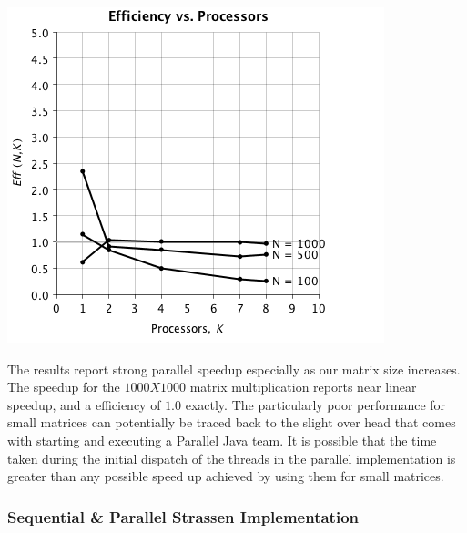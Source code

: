 \documentclass{dependencies/acm_proc_article-sp}
\begin{document}
\begin{center}
\includegraphics[scale=0.5]{images/parallel/eff-vs-proc.png}
\end{center}
The results report strong parallel speedup especially as our matrix 
size increases. The speedup for the $1000 X 1000$ matrix multiplication reports
near linear speedup, and a efficiency of $1.0$ exactly. The particularly poor performance
for small matrices can potentially be traced back to the slight over head
that comes with starting and executing a Parallel Java team. It is possible that the time taken during
the initial dispatch of the threads in the parallel implementation is greater
than any possible speed up achieved by using them for small matrices. 


\subsubsection{Sequential \& Parallel Strassen Implementation}
\end{document}
